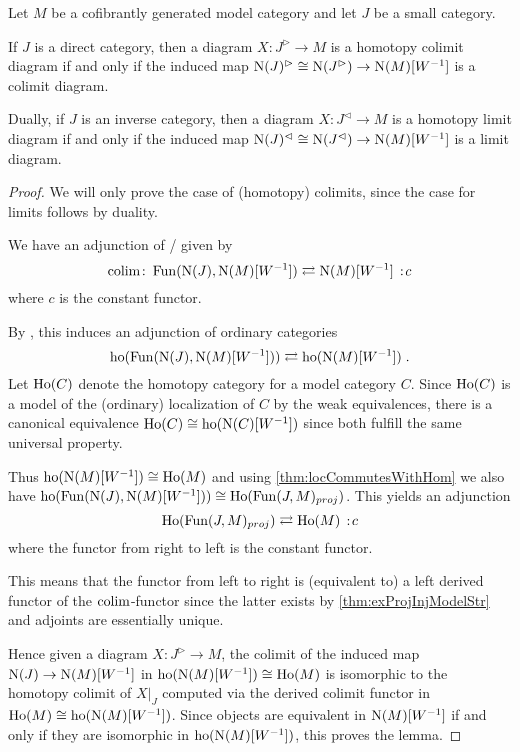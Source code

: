 \begin{lemma}\label{lem:htpyLimAndColimAgree}
    Let $M$ be a cofibrantly generated model category and let $J$ be a small category.
    
    If $J$ is a direct category, then a diagram $X\colon J^{\rhd}\to M$ is a homotopy colimit diagram if and only if the induced map $\operatorname{N}(J)^{\rhd}\cong\operatorname{N}(J^{\rhd})\to\operatorname{N}(M)[W^{-1}]$ is a colimit diagram.

    Dually, if $J$ is an inverse category, then a diagram $X\colon J^{\lhd}\to M$ is a homotopy limit diagram if and only if the induced map $\operatorname{N}(J)^{\lhd}\cong\operatorname{N}(J^{\lhd})\to\operatorname{N}(M)[W^{-1}]$ is a limit diagram.
    \begin{proof}
        We will only prove the case of (homotopy) colimits, since the case for limits follows by duality.

        We have an adjunction of \inftycats/ given by 
        \begin{equation*}
            \colim\colon\Fun(\N(J),\N(M)[W^{-1}])\rightleftarrows\N(M)[W^{-1}]\mkern+3mu:\mkern-3mu c
        \end{equation*}
        where $c$ is the constant functor.

        By \cite[Remark 6.1.5]{cisinski_2019}, this induces an adjunction of ordinary categories
        \begin{equation*}
            \operatorname{ho}(\operatorname{Fun}(\operatorname{N}(J),\operatorname{N}(M)[W^{-1}]))\rightleftarrows\operatorname{ho}(\operatorname{N}(M)[W^{-1}])\;.
        \end{equation*}
        Let $\operatorname{Ho}(C)$ denote the homotopy category for a model category $C$. 
        Since $\operatorname{Ho}(C)$ is a model of the (ordinary) localization of $C$ by the weak equivalences, there is a canonical equivalence $\operatorname{Ho}(C)\cong\operatorname{ho}(\operatorname{N}(C)[W^{-1}])$ since both fulfill the same universal property. %
        
        Thus $\operatorname{ho}(\operatorname{N}(M)[W^{-1}])\cong\operatorname{Ho}(M)$ and using \cref{thm:locCommutesWithHom} we also have $\operatorname{ho}(\operatorname{Fun}(\operatorname{N}(J),\operatorname{N}(M)[W^{-1}]))\cong\operatorname{Ho}(\operatorname{Fun}(J,M)_{proj})$.
        This yields an adjunction
        \begin{equation*}
            \Ho(\Fun(J,M)_{proj})\rightleftarrows\Ho(M)\mkern+3mu:\mkern-3mu c
        \end{equation*}
        where the functor from right to left is the constant functor.

        This means that the functor from left to right is (equivalent to) a left derived functor of the $\operatorname*{colim}$-functor since the latter exists by \cref{thm:exProjInjModelStr} and adjoints are essentially unique.

        Hence given a diagram $X\colon J^{\rhd}\to M$, the colimit of the induced map $\operatorname{N}(J)\to\operatorname{N}(M)[W^{-1}]$ in $\operatorname{ho}(\operatorname{N}(M)[W^{-1}])\cong\operatorname{Ho}(M)$ is isomorphic to the homotopy colimit of $X|_J$ computed via the derived colimit functor in $\operatorname{Ho}(M)\cong\operatorname{ho}(\operatorname{N}(M)[W^{-1}])$.
        Since objects are equivalent in $\operatorname{N}(M)[W^{-1}]$ if and only if they are isomorphic in $\operatorname{ho}(\operatorname{N}(M)[W^{-1}])$, this proves the lemma. %
    \end{proof}
\end{lemma}
